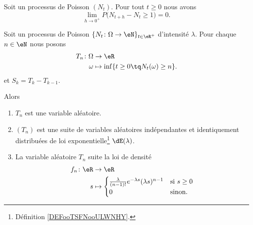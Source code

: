 \begin{proposition}   \label{PROPooGMBBooCIkVCB}
    Soit un processus de Poisson \( (N_t)\). Pour tout \( t\geq 0\) nous avons
    \begin{equation}
        \lim_{h\to 0^+} P\big( N_{t+h}-N_t\geq 1 \big)=0.
    \end{equation}
\end{proposition}

\begin{theorem}     \label{THOooYRIMooSREVEO}
    Soit un processus de Poisson \(  \{ N_t\colon \Omega\to \eN \}_{t\in \eR^+}  \) d'intensité \( \lambda\). Pour chaque \( n\in \eN\) nous posons
    \begin{equation}
        \begin{aligned}
            T_n\colon \Omega&\to \eR \\
            \omega&\mapsto \inf\{ t\geq 0\tq N_t(\omega)\geq n \}. 
        \end{aligned}
    \end{equation}
    et \( S_k=T_k-T_{k-1}\).

    Alors
    \begin{enumerate}
        \item       \label{ITEMooSLWOooRjYhBA}
            \( T_n\) est une variable aléatoire.    
        \item
            \( (T_n)\) est une suite de variables aléatoires indépendantes et identiquement distribuées de loi exponentielle\footnote{Définition \ref{DEFooTSFNooULWNHY}.} \( \dE(\lambda)\).
        \item
            La variable aléatoire \( T_n\) suite la loi de densité
            \begin{equation}
                \begin{aligned}
                    f_n\colon \eR&\to \eR \\
                    s&\mapsto \begin{cases}
                        \frac{ \lambda }{ (n-1)! } e^{-\lambda s}(\lambda s)^{n-1}    &   \text{si } s\geq 0\\
                        0    &    \text{sinon. }
                    \end{cases}\\
                \end{aligned}
            \end{equation}
    \end{enumerate}
\end{theorem}

